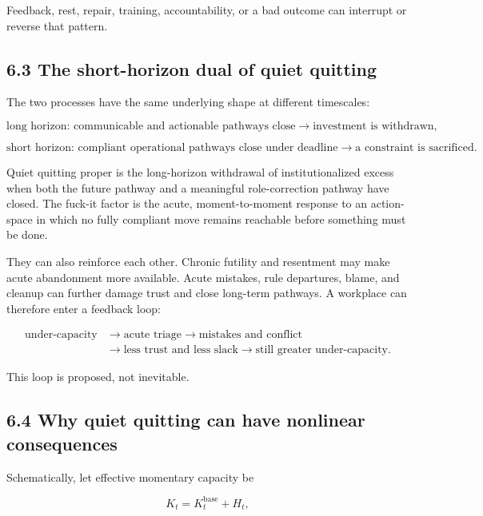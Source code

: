 \documentclass[11pt,oneside]{article}
\begin{document}
Feedback, rest, repair, training, accountability, or a bad outcome can
interrupt or reverse that pattern.

\hypertarget{the-short-horizon-dual-of-quiet-quitting}{%
\subsection{6.3 The short-horizon dual of quiet
quitting}\label{the-short-horizon-dual-of-quiet-quitting}}

The two processes have the same underlying shape at different
timescales:

\[
\text{long horizon: communicable and actionable pathways close}
\longrightarrow
\text{investment is withdrawn},
\]

\[
\text{short horizon: compliant operational pathways close under deadline}
\longrightarrow
\text{a constraint is sacrificed}.
\]

Quiet quitting proper is the long-horizon withdrawal of
institutionalized excess when both the future pathway and a meaningful
role-correction pathway have closed. The fuck-it factor is the acute,
moment-to-moment response to an action-space in which no fully compliant
move remains reachable before something must be done.

They can also reinforce each other. Chronic futility and resentment may
make acute abandonment more available. Acute mistakes, rule departures,
blame, and cleanup can further damage trust and close long-term
pathways. A workplace can therefore enter a feedback loop:

\[
\begin{aligned}
\text{under-capacity}
&\rightarrow
\text{acute triage}
\rightarrow
\text{mistakes and conflict}
\\
&\rightarrow
\text{less trust and less slack}
\rightarrow
\text{still greater under-capacity}.
\end{aligned}
\]

This loop is proposed, not inevitable.

\hypertarget{why-quiet-quitting-can-have-nonlinear-consequences}{%
\subsection{6.4 Why quiet quitting can have nonlinear
consequences}\label{why-quiet-quitting-can-have-nonlinear-consequences}}

Schematically, let effective momentary capacity be

\[
K_t = K_t^{\mathrm{base}} + H_t,
\]
\end{document}
